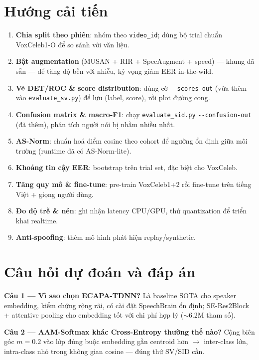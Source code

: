 \documentclass[12pt,a4paper]{article}
\begin{document}
\section{Hướng cải tiến}
\label{sec:future}
\begin{enumerate}
  \item \textbf{Chia split theo phiên}: nhóm theo \texttt{video\_id}; dùng bộ trial
  chuẩn VoxCeleb1-O để so sánh với văn liệu.
  \item \textbf{Bật augmentation} (MUSAN + RIR + SpecAugment + speed) --- khung đã
  sẵn --- để tăng độ bền với nhiễu, kỳ vọng giảm EER in-the-wild.
  \item \textbf{Vẽ DET/ROC \& score distribution}: dùng cờ \texttt{-{}-scores-out}
  (vừa thêm vào \texttt{evaluate\_sv.py}) để lưu (label, score), rồi plot đường cong.
  \item \textbf{Confusion matrix \& macro-F1}: chạy \texttt{evaluate\_sid.py}
  \texttt{-{}-confusion-out} (đã thêm), phân tích người nói bị nhầm nhiều nhất.
  \item \textbf{AS-Norm}: chuẩn hoá điểm cosine theo cohort để ngưỡng ổn định giữa
  môi trường (runtime đã có AS-Norm-lite).
  \item \textbf{Khoảng tin cậy EER}: bootstrap trên trial set, đặc biệt cho VoxCeleb.
  \item \textbf{Tăng quy mô \& fine-tune}: pre-train VoxCeleb1+2 rồi fine-tune trên
  tiếng Việt + giọng người dùng.
  \item \textbf{Đo độ trễ \& nén}: ghi nhận latency CPU/GPU, thử quantization để
  triển khai realtime.
  \item \textbf{Anti-spoofing}: thêm mô hình phát hiện replay/synthetic.
\end{enumerate}

\section{Câu hỏi dự đoán và đáp án}
\textbf{Câu 1 --- Vì sao chọn ECAPA-TDNN?} Là baseline SOTA cho speaker embedding,
kiểm chứng rộng rãi, có cài đặt SpeechBrain ổn định; SE-Res2Block + attentive
pooling cho embedding tốt với chi phí hợp lý ($\sim$6.2M tham số).

\textbf{Câu 2 --- AAM-Softmax khác Cross-Entropy thường thế nào?} Cộng biên góc
$m=0.2$ vào lớp đúng buộc embedding gần centroid hơn $\to$ inter-class lớn,
intra-class nhỏ trong không gian cosine --- đúng thứ SV/SID cần.
\end{document}
